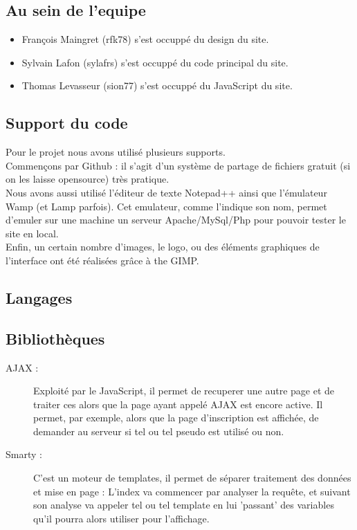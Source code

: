 \subsection{Au sein de l'equipe}
				\begin{itemize}
					\item François Maingret (rfk78) s'est occuppé du design du site.
					\item Sylvain Lafon (sylafrs) s'est occuppé du code principal du site.
					\item Thomas Levasseur (sion77) s'est occuppé du JavaScript du site.
				\end{itemize}
			\subsection{Support du code}
				Pour le projet nous avons utilisé plusieurs supports.\\
				Commençons par Github : il s'agit d'un système de partage de fichiers gratuit (si on les laisse opensource) très pratique.\\
				Nous avons aussi utilisé l'éditeur de texte Notepad++ ainsi que l'émulateur Wamp (et Lamp parfois). Cet emulateur, comme l'indique son nom, permet d'emuler sur une machine un serveur Apache/MySql/Php pour pouvoir tester le site en local.\\
				Enfin, un certain nombre d'images, le logo, ou des éléments graphiques de l'interface ont été réalisées grâce à the GIMP. 
		\subsection{Langages}			
			

		\subsection{Bibliothèques}
		
\begin{description}
	\item[AJAX :] Exploité par le JavaScript, il permet de recuperer une autre page et de traiter ces alors que la page ayant appelé AJAX est encore active.
Il permet, par exemple, alors que la page d'inscription est affichée, de demander au serveur si tel ou tel pseudo est utilisé ou non.

	\item[Smarty :] C'est un moteur de templates, il permet de séparer traitement des données et mise en page : L'index va commencer par analyser la requête, et suivant son analyse va appeler tel ou tel template en lui 'passant' des variables qu'il pourra alors utiliser pour l'affichage.
\end{description}
